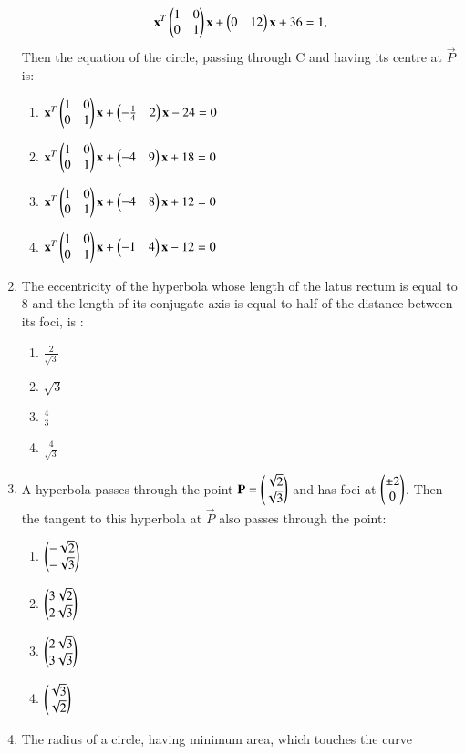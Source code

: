 \documentclass[journal,12pt,twocolumn]{IEEEtran}
\begin{document}
\begin{enumerate}[label=\arabic*]
    \begin{align}
    \mathbf{x}^T\begin{pmatrix}1&0\\0&1\end{pmatrix}\mathbf{x}+\begin{pmatrix}0&12\end{pmatrix}\mathbf{x}+36=1,
    \end{align} Then the equation of the circle, passing through C and having its centre at $\vec{P}$ is:
    \begin{enumerate}
    \item $\mathbf{x}^T\begin{pmatrix}1&0\\0&1\end{pmatrix}\mathbf{x}+\begin{pmatrix}-\frac{1}{4}&2\end{pmatrix}\mathbf{x}-24=0$
    \item $\mathbf{x}^T\begin{pmatrix}1&0\\0&1\end{pmatrix}\mathbf{x}+\begin{pmatrix}-4&9\end{pmatrix}\mathbf{x}+18=0$
    \item $\mathbf{x}^T\begin{pmatrix}1&0\\0&1\end{pmatrix}\mathbf{x}+\begin{pmatrix}-4&8\end{pmatrix}\mathbf{x}+12=0$    
    \item $\mathbf{x}^T\begin{pmatrix}1&0\\0&1\end{pmatrix}\mathbf{x}+\begin{pmatrix}-1&4\end{pmatrix}\mathbf{x}-12=0$
    \end{enumerate}
    \item The eccentricity of the hyperbola whose length of the latus rectum is equal to 8 and the length of its conjugate axis is equal to half of the distance between its foci, is :
    \begin{enumerate}
    \item $\frac{2}{\sqrt{3}}$
    \item $\sqrt{3}$
    \item $\frac{4}{3}$
    \item $\frac{4}{\sqrt{3}}$
    \end{enumerate}
    \item A hyperbola passes through the point $\mathbf{P}=\begin{pmatrix}\sqrt{2}\\\sqrt{3}\end{pmatrix}$ and has foci at 
    $\begin{pmatrix}\pm2\\0\end{pmatrix}$. Then the tangent to this hyperbola at $\vec{P}$ also passes through the point:
    \begin{enumerate}
    \item $\begin{pmatrix}-\sqrt{2}\\-\sqrt{3}\end{pmatrix}$
    \item $\begin{pmatrix}3\sqrt{2}\\2\sqrt{3}\end{pmatrix}$
    \item $\begin{pmatrix}2\sqrt{3}\\3\sqrt{3}\end{pmatrix}$
    \item $\begin{pmatrix}\sqrt{3}\\\sqrt{2}\end{pmatrix}$
    \end{enumerate}
    \item The radius of a circle, having minimum area, which touches the curve 

\end{enumerate}
\end{document}
